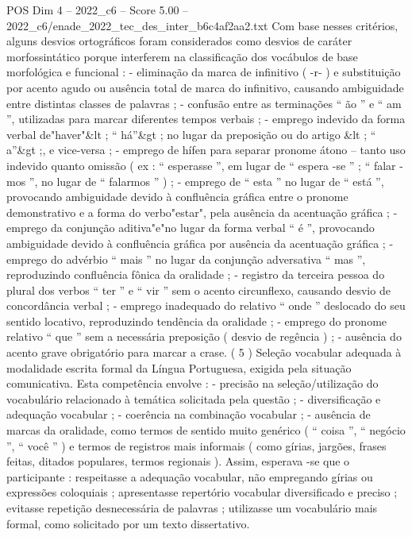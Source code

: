 \begin{textsample}{POS Dim 4 – 2022\_c6 – Score 5.00 – 2022\_c6/enade\_2022\_tec\_des\_inter\_b6c4af2aa2.txt}
Com base nesses critérios, alguns desvios ortográficos foram considerados como desvios de caráter morfossintático porque interferem na classificação dos vocábulos de base morfológica e funcional : - eliminação da marca de infinitivo ( -r- ) e substituição por acento agudo ou ausência total de marca do infinitivo, causando ambiguidade entre distintas classes de palavras ; - confusão entre as terminações “ ão ” e “ am ”, utilizadas para marcar diferentes tempos verbais ; - emprego indevido da forma verbal de"haver"\&lt ; “ há”\&gt ; no lugar da preposição ou do artigo \&lt ; “ a”\&gt ;, e vice-versa ; - emprego de hífen para separar pronome átono – tanto uso indevido quanto omissão ( ex : “ esperasse ”, em lugar de “ espera -se ” ; “ falar -mos ”, no lugar de “ falarmos ” ) ; - emprego de “ esta ” no lugar de “ está ”, provocando ambiguidade devido à confluência gráfica entre o pronome demonstrativo e a forma do verbo"estar", pela ausência da acentuação gráfica ; - emprego da conjunção aditiva"e"no lugar da forma verbal “ é ”, provocando ambiguidade devido à confluência gráfica por ausência da acentuação gráfica ; - emprego do advérbio “ mais ” no lugar da conjunção adversativa “ mas ”, reproduzindo confluência fônica da oralidade ; - registro da terceira pessoa do plural dos verbos “ ter ” e “ vir ” sem o acento circunflexo, causando desvio de concordância verbal ; - emprego inadequado do relativo “ onde ” deslocado do seu sentido locativo, reproduzindo tendência da oralidade ; - emprego do pronome relativo “ que ” sem a necessária preposição ( desvio de regência ) ; - ausência do acento grave obrigatório para marcar a crase. ( 5 ) Seleção vocabular adequada à modalidade escrita formal da Língua Portuguesa, exigida pela situação comunicativa.
Esta competência envolve : - precisão na seleção/utilização do vocabulário relacionado à temática solicitada pela questão ; - diversificação e adequação vocabular ; - coerência na combinação vocabular ; - ausência de marcas da oralidade, como termos de sentido muito genérico ( “ coisa ”, “ negócio ”, “ você ” ) e termos de registros mais informais ( como gírias, jargões, frases feitas, ditados populares, termos regionais ).
Assim, esperava -se que o participante : respeitasse a adequação vocabular, não empregando gírias ou expressões coloquiais ; apresentasse repertório vocabular diversificado e preciso ; evitasse repetição desnecessária de palavras ; utilizasse um vocabulário mais formal, como solicitado por um texto dissertativo.

\end{textsample}
